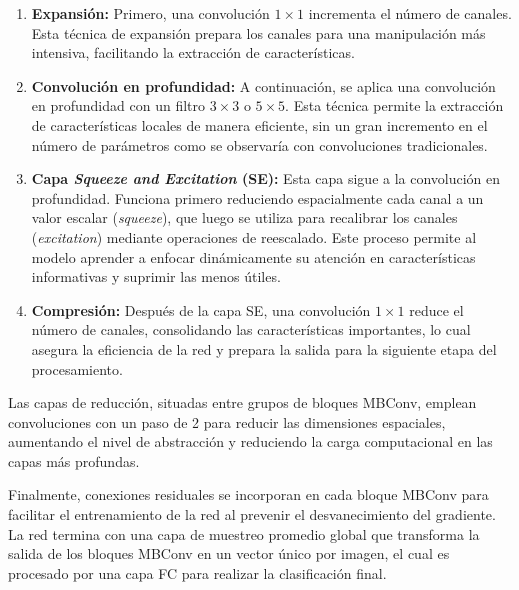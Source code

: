 \begin{enumerate}
	\item \textbf{Expansión:} Primero, una convolución \(1 \times 1\) incrementa el número de canales. Esta técnica de expansión prepara los canales para una manipulación más intensiva, facilitando la extracción de características.
	
	\item \textbf{Convolución en profundidad:} A continuación, se aplica una convolución en profundidad con un filtro \(3 \times 3\) o \(5 \times 5\). Esta técnica permite la extracción de características locales de manera eficiente, sin un gran incremento en el número de parámetros como se observaría con convoluciones tradicionales.
	
	\item \textbf{Capa \textit{Squeeze and Excitation} (SE):} Esta capa sigue a la convolución en profundidad. Funciona primero reduciendo espacialmente cada canal a un valor escalar (\textit{squeeze}), que luego se utiliza para recalibrar los canales (\textit{excitation}) mediante operaciones de reescalado. Este proceso permite al modelo aprender a enfocar dinámicamente su atención en características informativas y suprimir las menos útiles.
	
	\item \textbf{Compresión:} Después de la capa SE, una convolución \(1 \times 1\) reduce el número de canales, consolidando las características importantes, lo cual asegura la eficiencia de la red y prepara la salida para la siguiente etapa del procesamiento.
\end{enumerate}

Las capas de reducción, situadas entre grupos de bloques MBConv, emplean convoluciones con un paso de 2 para reducir las dimensiones espaciales, aumentando el nivel de abstracción y reduciendo la carga computacional en las capas más profundas.

Finalmente, conexiones residuales se incorporan en cada bloque MBConv para facilitar el entrenamiento de la red al prevenir el desvanecimiento del gradiente. La red termina con una capa de muestreo promedio global que transforma la salida de los bloques MBConv en un vector único por imagen, el cual es procesado por una capa FC para realizar la clasificación final.


